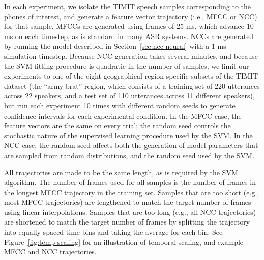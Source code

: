 In each experiment,
we isolate the TIMIT speech samples
corresponding to the phones
of interest,
and generate a feature vector trajectory
(i.e., MFCC or NCC)
for that sample.
MFCCs are generated using frames
of 25 ms,
which advance 10 ms on each timestep,
as is standard in many ASR systems.
NCCs are generated
by running the model described in
Section~\ref{sec:ncc-neural} with a 1 ms simulation timestep.
Because NCC generation takes several minutes,
and because the SVM fitting procedure
is quadratic in the number of samples,
we limit our experiments to
one of the eight geographical region-specific subsets
of the TIMIT dataset
(the ``army brat'' region,
which consists of a training set
of 220 utterances across 22 speakers,
and a test set of 110 utterances
across 11 different speakers),
but run each experiment
10 times with different random seeds
to generate confidence intervals
for each experimental condition.
In the MFCC case,
the feature vectors are the same
on every trial;
the random seed controls the
stochastic nature of
the supervised learning procedure
used by the SVM.
In the NCC case,
the random seed affects both
the generation of model parameters
that are sampled from random distributions,
and the random seed used by the SVM.

All trajectories are
made to be the same length,
as is required by the SVM algorithm.
The number of frames used
for all samples is
the number of frames in
the longest MFCC trajectory
in the training set.
Samples that are too short
(e.g., most MFCC trajectories)
are lengthened to match the
target number of frames
using linear interpolations.
Samples that are too long
(e.g., all NCC trajectories)
are shortened to match the
target number of frames
by splitting the trajectory
into equally spaced time bins
and taking the average
for each bin.
See Figure~\ref{fig:temp-scaling} for
an illustration of temporal scaling,
and example MFCC and NCC trajectories.


